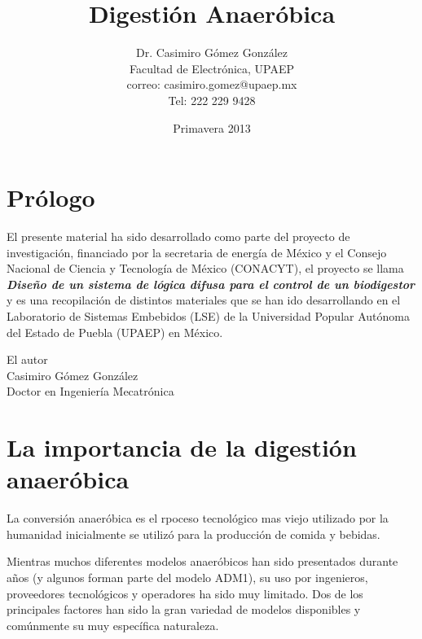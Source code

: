 \documentclass[12pt,letterpaper,twoside]{book}
\title{Digestión Anaeróbica}
\author{Dr. Casimiro Gómez González\\
	Facultad de Electrónica, UPAEP\\
               correo: casimiro.gomez@upaep.mx\\
               Tel: 222 229 9428}
\date{Primavera 2013}
\begin{document}
\frontmatter
\maketitle


\chapter{Prólogo}
El presente material ha sido desarrollado como parte del proyecto de investigación, financiado por la secretaria de energía de México y el Consejo Nacional de Ciencia y Tecnología de México (CONACYT), el proyecto se llama \textit{\textbf{Diseño de un sistema de lógica difusa para el control de un biodigestor}} y es una recopilación de distintos materiales que se han ido desarrollando en el Laboratorio de Sistemas Embebidos (LSE) de la Universidad Popular Autónoma del Estado de Puebla (UPAEP) en México.
\begin{flushright}

El autor\\
Casimiro Gómez González\\
Doctor en Ingeniería Mecatrónica
\end{flushright}

\tableofcontents
\listoftables
\listoffigures

\mainmatter
\chapter{La importancia de la digestión anaeróbica}
La conversión anaeróbica es el rpoceso tecnológico mas viejo utilizado por la humanidad inicialmente se utilizó para la producción de comida y bebidas.

Mientras muchos diferentes modelos anaeróbicos han sido presentados durante años (y algunos forman parte del modelo ADM1), su uso por ingenieros, proveedores tecnológicos y operadores ha sido muy limitado. Dos de los principales factores han sido la gran variedad de modelos disponibles y comúnmente su muy específica naturaleza.
\end{document}
